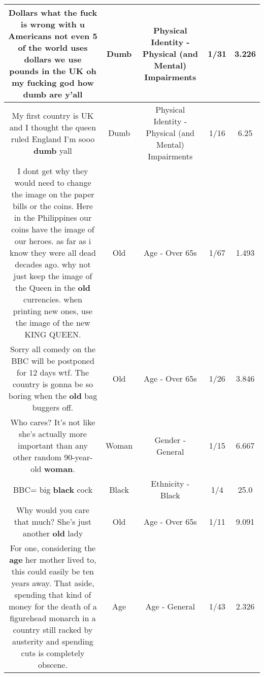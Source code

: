 \documentclass[11pt]{article}
\newlength\mylength
\begin{document}
\begin{center}
\begin{longtable}{|C{.65\mylength}|C{.30\mylength}|C{.12\mylength}|C{.12\mylength}|C{.12\mylength}|}
  \small Dollars what the fuck is wrong with u Americans not even 5 of the world uses dollars we use pounds in the UK oh my fucking god how \textbf{dumb} are y'all\normalsize   & Dumb & Physical Identity - Physical (and Mental) Impairments & 1/31 & 3.226 \\  \hline
  \small My first country is UK and I thought the queen ruled England I'm sooo \textbf{dumb} yall\normalsize   & Dumb & Physical Identity - Physical (and Mental) Impairments & 1/16 & 6.25 \\  \hline
  \small I dont get why they would need to change the image on the paper bills or the coins. Here in the Philippines our coins have the image of our heroes. as far as i know they were all dead decades ago. why not just keep the image of the Queen in the \textbf{old} currencies. when printing new ones, use the image of the new KING  QUEEN.\normalsize   & Old & Age - Over 65s & 1/67 & 1.493 \\  \hline
  \small Sorry all comedy on the BBC will be postponed for 12 days wtf. The country is gonna be so boring when the \textbf{old} bag buggers off.\normalsize   & Old & Age - Over 65s & 1/26 & 3.846 \\  \hline
  \small Who cares? It's not like she's actually more important than any other random 90-year-old \textbf{woman}.\normalsize   & Woman & Gender - General & 1/15 & 6.667 \\  \hline
  \small BBC= big \textbf{black} cock\normalsize   & Black & Ethnicity - Black & 1/4 & 25.0 \\  \hline
  \small Why would you care that much? She's just another \textbf{old} lady\normalsize   & Old & Age - Over 65s & 1/11 & 9.091 \\  \hline
  \small For one, considering the \textbf{age} her mother lived to, this could easily be ten years away. That aside, spending that kind of money for the death of a figurehead monarch in a country still racked by austerity and spending cuts is completely obscene.\normalsize   & Age & Age - General & 1/43 & 2.326 \\  \hline

\end{longtable}
\end{center}
\end{document}
